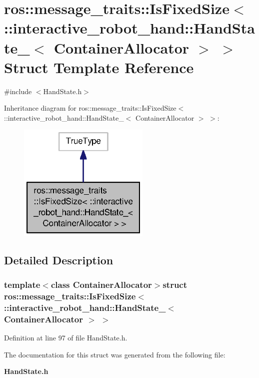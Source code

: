 \section{ros\-:\-:message\-\_\-traits\-:\-:Is\-Fixed\-Size$<$ \-:\-:interactive\-\_\-robot\-\_\-hand\-:\-:Hand\-State\-\_\-$<$ Container\-Allocator $>$ $>$ Struct Template Reference}
\label{structros_1_1message__traits_1_1IsFixedSize_3_01_1_1interactive__robot__hand_1_1HandState___3_01ContainerAllocator_01_4_01_4}


{\ttfamily \#include $<$Hand\-State.\-h$>$}



Inheritance diagram for ros\-:\-:message\-\_\-traits\-:\-:Is\-Fixed\-Size$<$ \-:\-:interactive\-\_\-robot\-\_\-hand\-:\-:Hand\-State\-\_\-$<$ Container\-Allocator $>$ $>$\-:\nopagebreak
\begin{figure}[H]
\begin{center}
\leavevmode
\includegraphics[width=178pt]{structros_1_1message__traits_1_1IsFixedSize_3_01_1_1interactive__robot__hand_1_1HandState___3_01d6b2ecc3c899e6036d6416a4be43edb2}
\end{center}
\end{figure}


\subsection{Detailed Description}
\subsubsection*{template$<$class Container\-Allocator$>$struct ros\-::message\-\_\-traits\-::\-Is\-Fixed\-Size$<$ \-::interactive\-\_\-robot\-\_\-hand\-::\-Hand\-State\-\_\-$<$ Container\-Allocator $>$ $>$}



Definition at line 97 of file Hand\-State.\-h.



The documentation for this struct was generated from the following file\-:\begin{DoxyCompactItemize}
\item 
{\bf Hand\-State.\-h}\end{DoxyCompactItemize}
